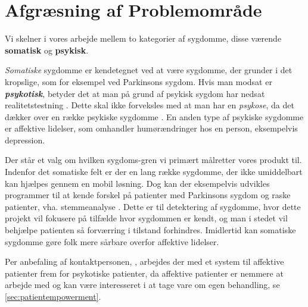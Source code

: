 \section{Afgræsning af Problemområde}
Vi skelner i vores arbejde mellem to kategorier af sygdomme, disse værende \textbf{somatisk} og \textbf{psykisk}.

\textit{Somatiske} sygdomme er kendetegnet ved at være sygdomme, der grunder i det kropslige, som for eksempel ved Parkinsons sygdom.
Hvis man modsat er \textbf{\textit{psykotisk}}, betyder det at man på grund af psykisk sygdom har nedsat realitetstestning \citep{misc:netpsykpsykose}.
Dette skal ikke forveksles med at man har en \textit{psykose}, da det dækker over en række psykiske sygdomme \citep{misc:netpsykpsykose}.
En anden type af psykiske sygdomme er affektive lidelser, som omhandler humørændringer hos en person, eksempelvis depression.

Der står et valg om hvilken sygdoms-gren vi primært målretter vores produkt til.
Indenfor det somatiske felt er der en lang række sygdomme, der ikke umiddelbart kan hjælpes gennem en mobil løsning.
Dog kan der eksempelvis udvikles programmer til at kende forskel på patienter med Parkinsons sygdom og raske patienter, vha. stemmeanalyse \citep{6168572}.
Dette er til detektering af sygdomme, hvor dette projekt vil fokusere på tilfælde hvor sygdommen er kendt, og man i stedet vil behjælpe patienten så forværring i tilstand forhindres.
Imidlertid kan somatiske sygdomme gøre folk mere sårbare overfor affektive lidelser.

Per anbefaling af kontaktpersonen, \citet{misc:janne-rasmussen}, arbejdes der med et system til affektive patienter frem for psykotiske patienter, da affektive patienter er nemmere at arbejde med og kan være interesseret i at tage vare om egen behandling, se \cref{sec:patientempowerment}.

